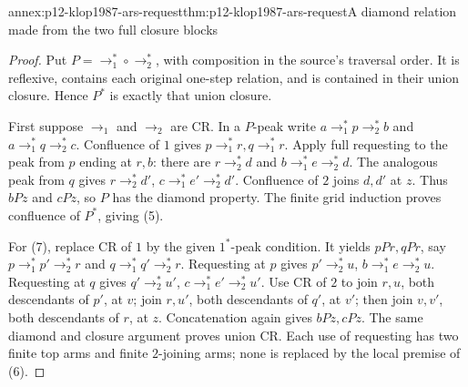 \begin{annexitem}{annex:p12-klop1987-ars-request}{thm:p12-klop1987-ars-request}{A diamond relation made from the two full closure blocks}
\begin{proof}
Put \(P=\to_1^*\circ\to_2^*\), with composition in the
source's traversal order. It is reflexive, contains each original
one-step relation, and is contained in their union closure. Hence
\(P^*\) is exactly that union closure.

First suppose \(\to_1\) and \(\to_2\) are CR. In a \(P\)-peak
write \(a\to_1^*p\to_2^*b\) and
\(a\to_1^*q\to_2^*c\). Confluence of \(1\) gives
\(p\to_1^*r,q\to_1^*r\). Apply full requesting to the
peak from \(p\) ending at \(r,b\): there are
\(r\to_2^*d\) and \(b\to_1^*e\to_2^*d\).
The analogous peak from \(q\) gives
\(r\to_2^*d'\), \(c\to_1^*e'\to_2^*d'\).
Confluence of \(2\) joins \(d,d'\) at \(z\).
Thus \(bPz\) and \(cPz\), so \(P\) has the diamond property.
The finite grid induction proves confluence of \(P^*\), giving (5).

For (7), replace CR of \(1\) by the given \(1^*\)-peak condition.
It yields \(pP r,qP r\), say
\(p\to_1^*p'\to_2^*r\) and
\(q\to_1^*q'\to_2^*r\). Requesting at \(p\) gives
\(p'\to_2^*u\), \(b\to_1^*e\to_2^*u\).
Requesting at \(q\) gives
\(q'\to_2^*u'\), \(c\to_1^*e'\to_2^*u'\).
Use CR of \(2\) to join \(r,u\), both descendants of \(p'\),
at \(v\); join \(r,u'\), both descendants of \(q'\), at
\(v'\); then join \(v,v'\), both descendants of \(r\),
at \(z\). Concatenation again gives \(bPz,cPz\).
The same diamond and closure argument proves union CR. Each use of
requesting has two finite top arms and finite \(2\)-joining arms;
none is replaced by the local premise of (6).
\end{proof}
\end{annexitem}

